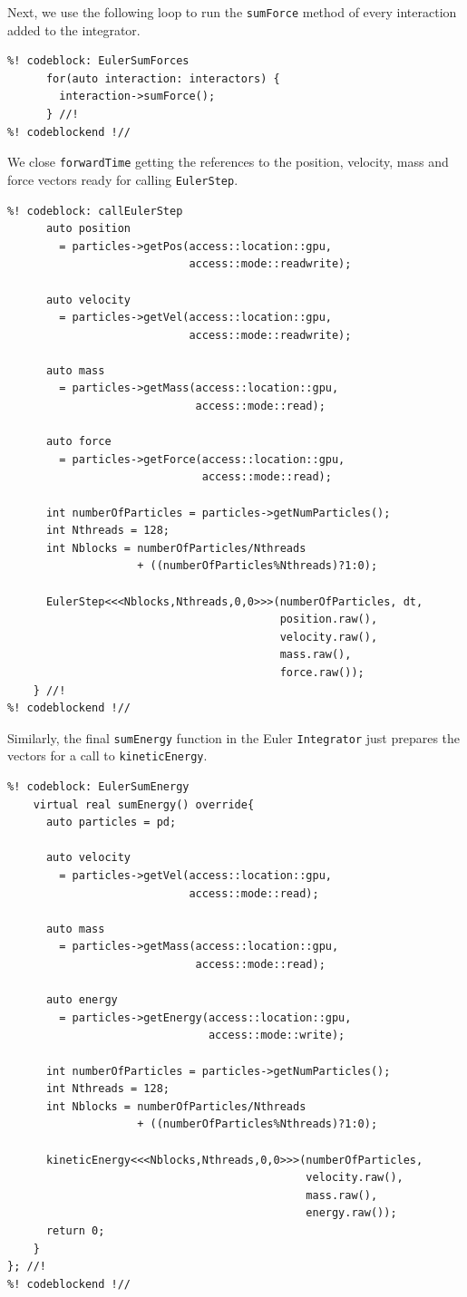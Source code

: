 Next, we use the following loop to run the \texttt{sumForce} method of every 
interaction added to the integrator.
\begin{lstlisting}
%! codeblock: EulerSumForces
      for(auto interaction: interactors) {
        interaction->sumForce();
      } //!
%! codeblockend !//
\end{lstlisting}
We close \texttt{forwardTime} getting the references to the position, velocity, 
mass and force vectors ready for calling \texttt{EulerStep}.
\begin{lstlisting}
%! codeblock: callEulerStep
      auto position
        = particles->getPos(access::location::gpu,
                            access::mode::readwrite);

      auto velocity
        = particles->getVel(access::location::gpu,
                            access::mode::readwrite);

      auto mass
        = particles->getMass(access::location::gpu,
                             access::mode::read);

      auto force
        = particles->getForce(access::location::gpu,
                              access::mode::read);

      int numberOfParticles = particles->getNumParticles();
      int Nthreads = 128;
      int Nblocks = numberOfParticles/Nthreads
                    + ((numberOfParticles%Nthreads)?1:0);

      EulerStep<<<Nblocks,Nthreads,0,0>>>(numberOfParticles, dt,
                                          position.raw(),
                                          velocity.raw(),
                                          mass.raw(),
                                          force.raw());
    } //!
%! codeblockend !//
\end{lstlisting}

Similarly, the final \texttt{sumEnergy} function in the Euler 
\texttt{Integrator} just prepares the vectors for a call to 
\texttt{kineticEnergy}.
\begin{lstlisting}
%! codeblock: EulerSumEnergy
    virtual real sumEnergy() override{
      auto particles = pd;

      auto velocity
        = particles->getVel(access::location::gpu,
                            access::mode::read);

      auto mass
        = particles->getMass(access::location::gpu,
                             access::mode::read);

      auto energy
        = particles->getEnergy(access::location::gpu,
                               access::mode::write);

      int numberOfParticles = particles->getNumParticles();
      int Nthreads = 128;
      int Nblocks = numberOfParticles/Nthreads
                    + ((numberOfParticles%Nthreads)?1:0);

      kineticEnergy<<<Nblocks,Nthreads,0,0>>>(numberOfParticles,
                                              velocity.raw(),
                                              mass.raw(),
                                              energy.raw());
      return 0;
    }
}; //!
%! codeblockend !//
\end{lstlisting}

